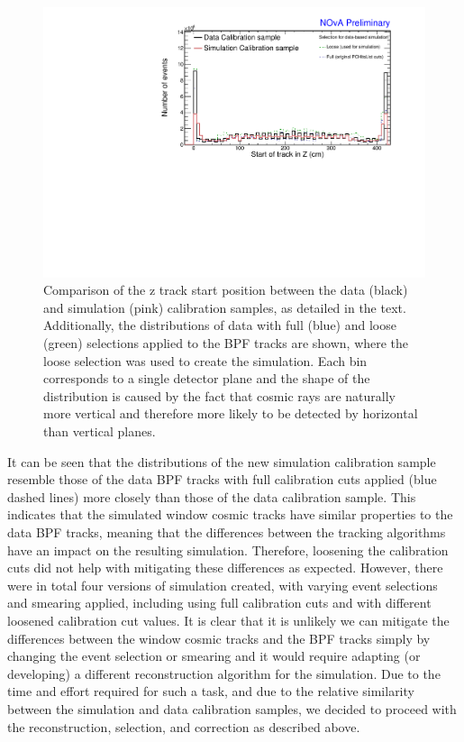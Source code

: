 \begin{figure}[!ht]
\includegraphics[clip, width=\textwidth]{Plots/TBCalibration/DBSim_DataMCComparison_StartZ.pdf}
\caption[Data-Simulation comparison of track start distribution]{Comparison of the z track start position between the data (black) and simulation (pink) calibration samples, as detailed in the text. Additionally, the distributions of data with full (blue) and loose (green) selections applied to the \acrshort{BPF} tracks are shown, where the loose selection was used to create the simulation. Each bin corresponds to a single detector plane and the shape of the distribution is caused by the fact that cosmic rays are naturally more vertical and therefore more likely to be detected by horizontal than vertical planes.}
\label{fig:DataBasedSimDataMCComparison_startZ}
\end{figure}

It can be seen that the distributions of the new simulation calibration sample resemble those of the data \gls{BPF} tracks with full calibration cuts applied (blue dashed lines) more closely than those of the data calibration sample. This indicates that the simulated window cosmic tracks have similar properties to the data \gls{BPF} tracks, meaning that the differences between the tracking algorithms have an impact on the resulting simulation. Therefore, loosening the calibration cuts did not help with mitigating these differences as expected. However, there were in total four versions of simulation created, with varying event selections and smearing applied, including using full calibration cuts and with different loosened calibration cut values. It is clear that it is unlikely we can mitigate the differences between the window cosmic tracks and the \gls{BPF} tracks simply by changing the event selection or smearing and it would require adapting (or developing) a different reconstruction algorithm for the simulation. Due to the time and effort required for such a task, and due to the relative similarity between the simulation and data calibration samples, we decided to proceed with the reconstruction, selection, and correction as described above.

